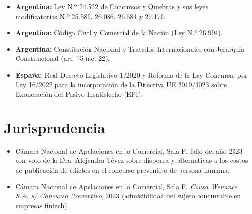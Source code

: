 \documentclass[12pt,oneside]{book}
\begin{document}
\begin{itemize}
    \item \textbf{Argentina:} Ley N.º 24.522 de Concursos y Quiebras y sus leyes modificatorias N.º 25.589, 26.086, 26.684 y 27.170.
    \item \textbf{Argentina:} Código Civil y Comercial de la Nación (Ley N.º 26.994).
    \item \textbf{Argentina:} Constitución Nacional y Tratados Internacionales con Jerarquía Constitucional (art. 75 inc. 22).
    \item \textbf{España:} Real Decreto-Legislativo 1/2020 y Reforma de la Ley Concursal por Ley 16/2022 para la incorporación de la Directiva UE 2019/1023 sobre Exoneración del Pasivo Insatisfecho (EPI).
\end{itemize}

\section*{Jurisprudencia}

\begin{itemize}
    \item Cámara Nacional de Apelaciones en lo Comercial, Sala F, fallo del año 2023 con voto de la Dra. Alejandra Tévez sobre dispensa y alternativas a los costos de publicación de edictos en el concurso preventivo de persona humana.
    \item Cámara Nacional de Apelaciones en lo Comercial, Sala F, \textit{Causa Wenance S.A. s/ Concurso Preventivo}, 2023 (admisibilidad del sujeto concursable en empresas fintech).
\end{itemize}
\end{document}
